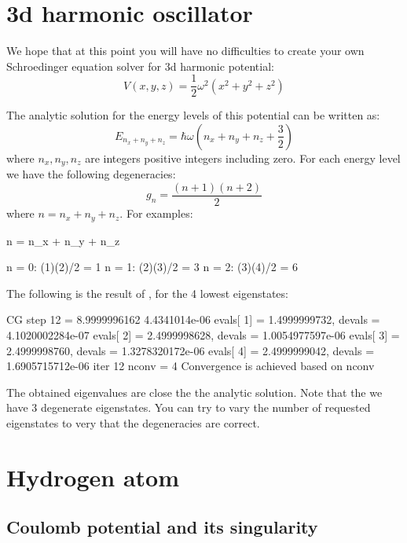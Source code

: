 \section{3d harmonic oscillator}

We hope that at this point you will have no difficulties to create your own
Schroedinger equation solver for 3d harmonic potential:
\begin{equation}
V(x,y,z) = \frac{1}{2}\omega^2 \left( x^2 + y^2 + z^2 \right)
\end{equation}

The analytic solution for the energy levels of this potential can be written as:
\begin{equation}
E_{n_{x} + n_{y} + n_{z}} = \hbar \omega \left( n_{x} + n_{y} + n_{z} + \frac{3}{2} \right)
\end{equation}
where $n_x, n_y, n_z$ are integers positive integers including zero.
%
For each energy level we have the following degeneracies:
\begin{equation}
g_{n} = \frac{(n + 1)(n + 2)}{2}
\end{equation}
where $n = n_x + n_y + n_z$.
%
For examples:
\begin{textcode}
n = n_x + n_y + n_z

n = 0: (1)(2)/2 = 1
n = 1: (2)(3)/2 = 3
n = 2: (3)(4)/2 = 6
\end{textcode}

The following is the result of , for the 4 lowest eigenstates:
\begin{textcode}
CG step       12 =       8.9999996162 4.4341014e-06
evals[  1] =       1.4999999732, devals =   4.1020002284e-07
evals[  2] =       2.4999998628, devals =   1.0054977597e-06
evals[  3] =       2.4999998760, devals =   1.3278320172e-06
evals[  4] =       2.4999999042, devals =   1.6905715712e-06
iter 12 nconv = 4
Convergence is achieved based on nconv    
\end{textcode}
%
The obtained eigenvalues are close the the analytic solution.
Note that the we have 3 degenerate eigenstates.
You can try to vary the number of requested eigenstates to very that the degeneracies are
correct.


\section{Hydrogen atom}

\subsection{Coulomb potential and its singularity}

